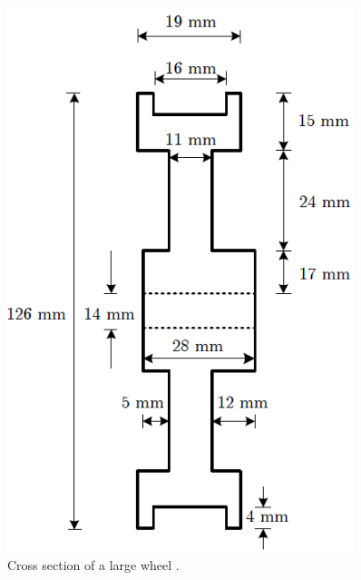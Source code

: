 \begin{figure}[htbp]
    \centering
    \begin{minipage}[t]{0.45\textwidth}
        \centering
        \includegraphics[width=0.9\textwidth]{figures/appendix/Motor&GearTests/BigWheel} 
        \caption{Cross section of a large wheel \citep{web:BalancingStick2008}.}
    \end{minipage}\hfill
    \begin{minipage}[t]{0.45\textwidth}
        \centering

\end{minipage}
\end{figure}
